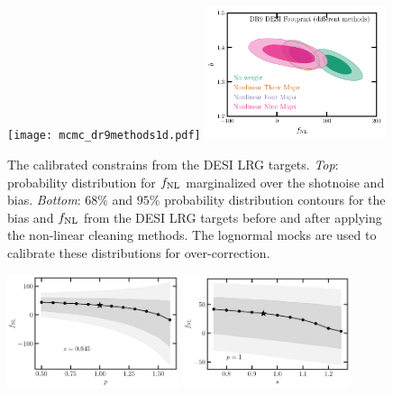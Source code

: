 \begin{figure}
    \raggedleft
    \texttt{[image: mcmc\_dr9methods1d.pdf]}
    \includegraphics[width=0.47\textwidth, trim={0 0 0.15cm 0.2cm},clip]{figures/mcmc_dr9methods.pdf} 
    \caption{The calibrated constrains from the DESI LRG targets. \textit{Top}: probability distribution for $f_{\rm NL}$ marginalized over the shotnoise and bias. \textit{Bottom}: $68\%$ and $95\%$ probability distribution contours for the bias and $f_{\rm NL}$ from the DESI LRG targets before and after applying the non-linear cleaning methods. The lognormal mocks are used to calibrate these distributions for over-correction.}\label{fig:mcmc_dr9}
\end{figure}

\begin{figure}
\raggedleft
\includegraphics[width=0.45\textwidth]{figures/fnl_p.pdf}
\includegraphics[width=0.437\textwidth]{figures/fnl_magbias.pdf}
\caption{}\label{fig:fnl_magbias}
\end{figure}


